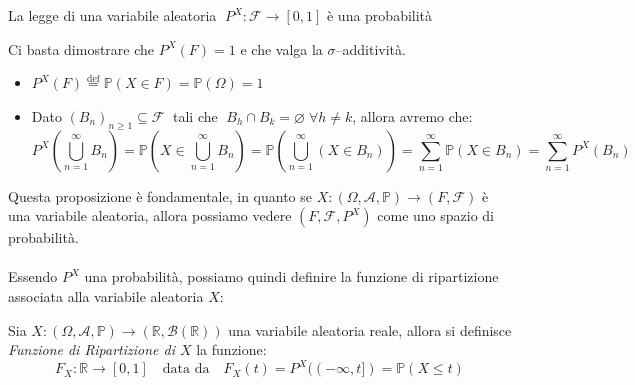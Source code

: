 \begin{proposizione}
    La legge di una variabile aleatoria \(\;P^X:\mathcal{F}\to [0, 1]\) è una probabilità
    \begin{dimostrazione}
    Ci basta dimostrare che $P^X(F) = 1$ e che valga la $\sigma$--additività.
    \begin{itemize}
        \item $P^X(F) \overset{\text{def}}{=} \mathbb{P}(X\in F) = \mathbb{P}(\Omega) = 1$
        \item Dato $(B_n)_{n\geq1}\subseteq\mathcal{F}\;$ tali che $\;B_h\cap B_k=\varnothing\;\forall h\neq k$, allora avremo che:
        \[P^X\left(\bigcup_{n=1}^\infty B_n\right) = \mathbb{P}\left(X\in\bigcup_{n=1}^\infty B_n\right) = \mathbb{P}\left(\bigcup_{n=1}^\infty(X\in B_n)\right)=\sum_{n=1}^\infty \mathbb{P}(X\in B_n)= \sum_{n=1}^\infty P^X(B_n)\]
    \end{itemize}
    \end{dimostrazione}
\end{proposizione}

Questa proposizione è fondamentale, in quanto se $X:(\Omega, \mathcal{A}, \mathbb{P})\to (F, \mathcal{F}) $ è una variabile aleatoria, allora possiamo vedere $(F, \mathcal{F}, P^X)$ come uno spazio di probabilità.\\
\\
Essendo $P^X$ una probabilità, possiamo quindi definire la funzione di ripartizione associata alla variabile aleatoria $X$:
\begin{definizione}
    Sia $X:(\Omega, \mathcal{A}, \mathbb{P})\to (\mathbb{R}, \mathcal{B}(\mathbb{R}))$ una variabile aleatoria reale, allora si definisce \textit{Funzione di Ripartizione di $X$} la funzione:
    \[F_X: \mathbb{R}\to [0, 1]\quad \text{data da}\quad F_X(t) = P^X((-\infty, t]) = \mathbb{P}(X\leq t)\]
\end{definizione}\bigskip

